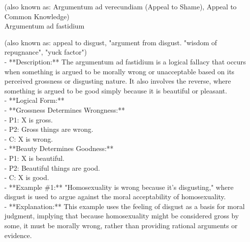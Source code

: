 \documentclass[a4paper,12pt,single,pdftex]{scrartcl}
\begin{document}
  
    
      (also known as: Argumentum ad verecundiam (Appeal to Shame), Appeal to Common Knowledge)
    \\

  

Argumentum ad fastidium
    
      (also known as: appeal to disgust, "argument from disgust. "wisdom of repugnance", "yuck factor")
    \\

  
    
      - **Description:** The argumentum ad fastidium is a logical fallacy that occurs when something is argued to be morally wrong or unacceptable based on its perceived grossness or disgusting nature. It also involves the reverse, where something is argued to be good simply because it is beautiful or pleasant.
    \\

    
      - **Logical Form:**
    \\

    
        - **Grossness Determines Wrongness:**
    \\

    
          - P1: X is gross.
    \\

    
          - P2: Gross things are wrong.
    \\

    
          - C: X is wrong.
    \\

    
        - **Beauty Determines Goodness:**
    \\

    
          - P1: X is beautiful.
    \\

    
          - P2: Beautiful things are good.
    \\

    
          - C: X is good.
    \\

    
      - **Example \#1:** "Homosexuality is wrong because it's disgusting," where disgust is used to argue against the moral acceptability of homosexuality.
    \\

    
      - **Explanation:** This example uses the feeling of disgust as a basis for moral judgment, implying that because homosexuality might be considered gross by some, it must be morally wrong, rather than providing rational arguments or evidence.
    \\
\end{document}
